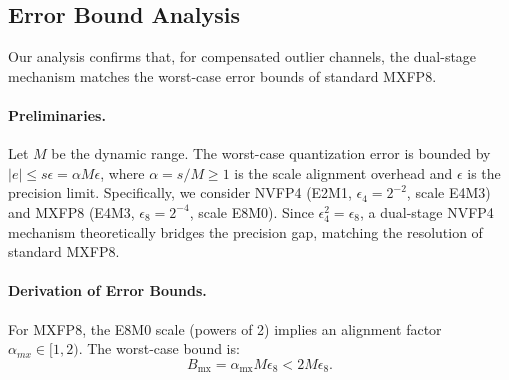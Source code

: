 \documentclass[11pt]{article}
\begin{document}
\subsection{Error Bound Analysis}

Our analysis confirms that, for compensated outlier channels, the dual-stage mechanism matches the worst-case error bounds of standard MXFP8.

\paragraph{Preliminaries.} Let $M$ be the dynamic range. The worst-case quantization error is bounded by $|e| \le s \epsilon = \alpha M \epsilon$, where $\alpha = s / M \ge 1$ is the scale alignment overhead and $\epsilon$ is the precision limit. Specifically, we consider NVFP4 (E2M1, $\epsilon_4 = 2^{-2}$, scale E4M3) and MXFP8 (E4M3, $\epsilon_8 = 2^{-4}$, scale E8M0). Since $\epsilon_4^2 = \epsilon_8$, a dual-stage NVFP4 mechanism theoretically bridges the precision gap, matching the resolution of standard MXFP8.

\paragraph{Derivation of Error Bounds.} For MXFP8, the E8M0 scale (powers of 2) implies an alignment factor $\alpha_{mx} \in [1, 2)$. The worst-case bound is:
\begin{equation}
    B_{\text{mx}} = \alpha_{\text{mx}} M \epsilon_8 < 2 M \epsilon_8. 
\end{equation}
\end{document}
